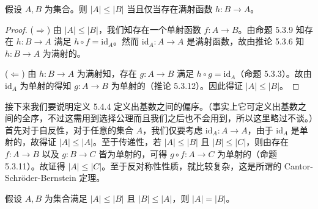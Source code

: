 \begin{proposition}
假设 $A, B$ 为集合。则 $|A| \leq |B|$ 当且仅当存在满射函数 $h : B \to A$。
\end{proposition}

\begin{proof}
($\Rightarrow$) 由 $|A| \leq |B|$，我们知存在一个单射函数 $f : A \to B$。由命题 5.3.9 知存在 $h : B \to A$ 满足 $h \circ f = \mathrm{id}_A$。然而 $\mathrm{id}_A : A \to A$ 是满射函数，故由推论 5.3.6 知 $h : B \to A$ 为满射的。

($\Leftarrow$) 由 $h : B \to A$ 为满射知，存在 $g : A \to B$ 满足 $h \circ g = \mathrm{id}_A$（命题 5.3.3）。故由 $\mathrm{id}_A$ 为单射的得知 $g : A \to B$ 为单射的（推论 5.3.12）。因此得证 $|A| \leq |B|$。
\end{proof}

接下来我们要说明定义 5.4.4 定义出基数之间的偏序。（事实上它可定义出基数之间的全序，不过这需用到选择公理而且我们之后也不会用到，所以这里略过不谈。）首先对于自反性，对于任意的集合 $A$，我们仅要考虑 $\mathrm{id}_A : A \to A$，由于 $\mathrm{id}_A$ 是单射的，故得证 $|A| \leq |A|$。至于传递性，若 $|A| \leq |B|$ 且 $|B| \leq |C|$，则由存在 $f : A \to B$ 以及 $g : B \to C$ 皆为单射的，可得 $g \circ f : A \to C$ 为单射的（命题 5.3.11）。故证得 $|A| \leq |C|$。至于反对称性性质，就比较复杂，这是所谓的 Cantor-Schröder-Bernstein 定理。

\begin{theorem}
假设 $A, B$ 为集合满足 $|A| \leq |B|$ 且 $|B| \leq |A|$，则 $|A| = |B|$。
\end{theorem}

